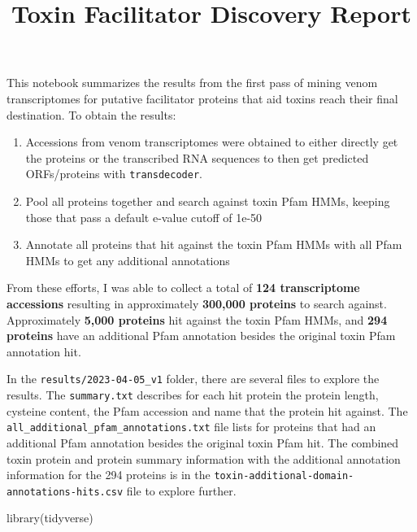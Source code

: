 \documentclass[
]{article}
\title{Toxin Facilitator Discovery Report}
\author{}
\date{\vspace{-2.5em}}
\newenvironment{Shaded}{\begin{snugshade}}{\end{snugshade}}
\newcommand{\FunctionTok}[1]{\textcolor[rgb]{0.00,0.00,0.00}{#1}}
\newcommand{\NormalTok}[1]{#1}
\providecommand{\tightlist}{%
  \setlength{\itemsep}{0pt}\setlength{\parskip}{0pt}}
\begin{document}
\maketitle

This notebook summarizes the results from the first pass of mining venom
transcriptomes for putative facilitator proteins that aid toxins reach
their final destination. To obtain the results:

\begin{enumerate}
\def\labelenumi{\arabic{enumi}.}
\tightlist
\item
  Accessions from venom transcriptomes were obtained to either directly
  get the proteins or the transcribed RNA sequences to then get
  predicted ORFs/proteins with \texttt{transdecoder}.
\item
  Pool all proteins together and search against toxin Pfam HMMs, keeping
  those that pass a default e-value cutoff of 1e-50
\item
  Annotate all proteins that hit against the toxin Pfam HMMs with all
  Pfam HMMs to get any additional annotations
\end{enumerate}

From these efforts, I was able to collect a total of \textbf{124
transcriptome accessions} resulting in approximately \textbf{300,000
proteins} to search against. Approximately \textbf{5,000 proteins} hit
against the toxin Pfam HMMs, and \textbf{294 proteins} have an
additional Pfam annotation besides the original toxin Pfam annotation
hit.

In the \texttt{results/2023-04-05\_v1} folder, there are several files
to explore the results. The \texttt{summary.txt} describes for each hit
protein the protein length, cysteine content, the Pfam accession and
name that the protein hit against. The
\texttt{all\_additional\_pfam\_annotations.txt} file lists for proteins
that had an additional Pfam annotation besides the original toxin Pfam
hit. The combined toxin protein and protein summary information with the
additional annotation information for the 294 proteins is in the
\texttt{toxin-additional-domain-annotations-hits.csv} file to explore
further.

\begin{Shaded}
\begin{Highlighting}[]
\FunctionTok{library}\NormalTok{(tidyverse)}
\end{Highlighting}
\end{Shaded}
\end{document}
